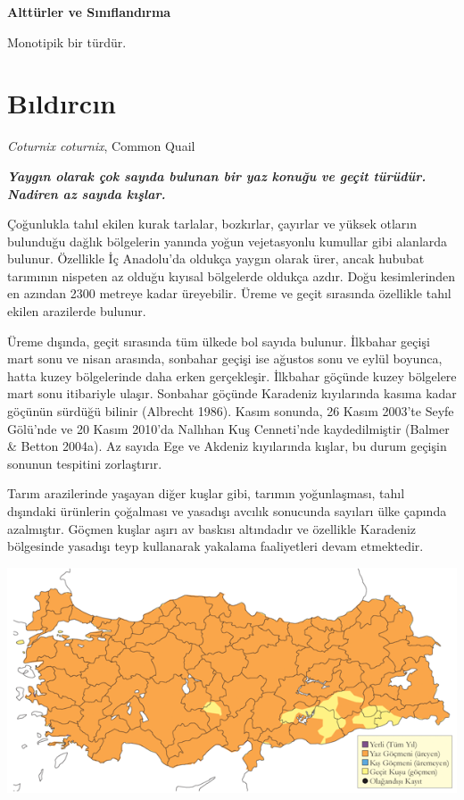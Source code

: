 \documentclass[
  letterpaper,
  DIV=11,
  numbers=noendperiod]{scrreprt}
\begin{document}
\textbf{Alttürler ve Sınıflandırma}

Monotipik bir türdür.

\section{Bıldırcın}\label{bux131ldux131rcux131n}

\emph{Coturnix coturnix}, Common Quail

\textbf{\emph{Yaygın olarak çok sayıda bulunan bir yaz konuğu ve geçit
türüdür. Nadiren az sayıda kışlar.}}

Çoğunlukla tahıl ekilen kurak tarlalar, bozkırlar, çayırlar ve yüksek
otların bulunduğu dağlık bölgelerin yanında yoğun vejetasyonlu kumullar
gibi alanlarda bulunur. Özellikle İç Anadolu'da oldukça yaygın olarak
ürer, ancak hububat tarımının nispeten az olduğu kıyısal bölgelerde
oldukça azdır. Doğu kesimlerinden en azından 2300 metreye kadar
üreyebilir. Üreme ve geçit sırasında özellikle tahıl ekilen arazilerde
bulunur.

Üreme dışında, geçit sırasında tüm ülkede bol sayıda bulunur. İlkbahar
geçişi mart sonu ve nisan arasında, sonbahar geçişi ise ağustos sonu ve
eylül boyunca, hatta kuzey bölgelerinde daha erken gerçekleşir. İlkbahar
göçünde kuzey bölgelere mart sonu itibariyle ulaşır. Sonbahar göçünde
Karadeniz kıyılarında kasıma kadar göçünün sürdüğü bilinir (Albrecht
1986). Kasım sonunda, 26 Kasım 2003'te Seyfe Gölü'nde ve 20 Kasım
2010'da Nallıhan Kuş Cenneti'nde kaydedilmiştir (Balmer \& Betton
2004a). Az sayıda Ege ve Akdeniz kıyılarında kışlar, bu durum geçişin
sonunun tespitini zorlaştırır.

Tarım arazilerinde yaşayan diğer kuşlar gibi, tarımın yoğunlaşması,
tahıl dışındaki ürünlerin çoğalması ve yasadışı avcılık sonucunda
sayıları ülke çapında azalmıştır. Göçmen kuşlar aşırı av baskısı
altındadır ve özellikle Karadeniz bölgesinde yasadışı teyp kullanarak
yakalama faaliyetleri devam etmektedir.

\includegraphics{images/harita_Page_043.png}
\end{document}

